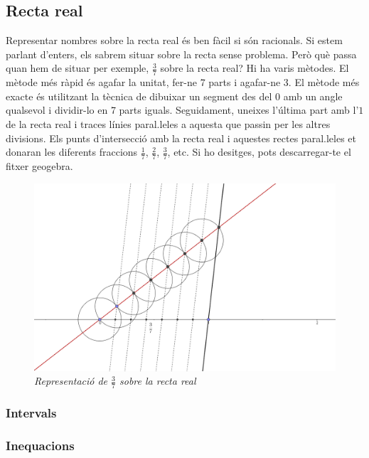 \documentclass[]{article}
\begin{document}
\subsection{Recta real}\label{recta-real}

Representar nombres sobre la recta real és ben fàcil si són racionals.
Si estem parlant d'enters, els sabrem situar sobre la recta sense
problema. Però què passa quan hem de situar per exemple, \(\frac{3}{7}\)
sobre la recta real? Hi ha varis mètodes. El mètode més ràpid és agafar
la unitat, fer-ne 7 parts i agafar-ne 3. El mètode més exacte és
utilitzant la tècnica de dibuixar un segment des del 0 amb un angle
qualsevol i dividir-lo en 7 parts iguals. Seguidament, uneixes l'última
part amb l'\(1\) de la recta real i traces línies paral.leles a aquesta
que passin per les altres divisions. Els punts d'intersecció amb la
recta real i aquestes rectes paral.leles et donaran les diferents
fraccions \(\frac{1}{7}\), \(\frac{2}{7}\), \(\frac{3}{7}\), etc. Si ho
desitges, pots descarregar-te el fitxer geogebra.

\begin{figure}[htbp]
\centering
\includegraphics{img/fraccions_recta_real_1.png}
\caption{\emph{Representació de \(\frac{3}{7}\) sobre la recta real}}
\end{figure}

\subsubsection{Intervals}\label{intervals}

\subsubsection{Inequacions}\label{inequacions}
\end{document}
